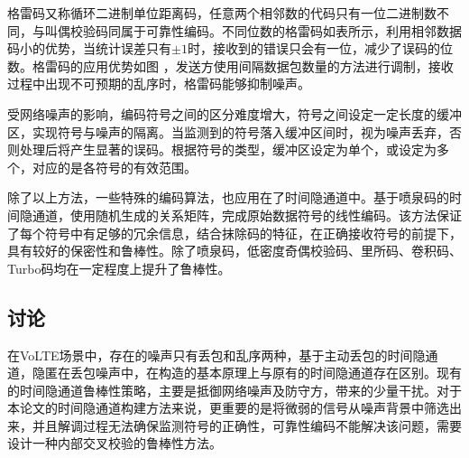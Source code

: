 格雷码又称循环二进制单位距离码，任意两个相邻数的代码只有一位二进制数不同，与叫偶校验码同属于可靠性编码。不同位数的格雷码如表所示，利用相邻数据码小的优势，当统计误差只有$\pm1$时，接收到的错误只会有一位，减少了误码的位数。格雷码的应用优势如图
，发送方使用间隔数据包数量的方法进行调制，接收过程中出现不可预期的乱序时，格雷码能够抑制噪声。

受网络噪声的影响，编码符号之间的区分难度增大，符号之间设定一定长度的缓冲区，实现符号与噪声的隔离。当监测到的符号落入缓冲区间时，视为噪声丢弃，否则处理后将产生显著的误码。根据符号的类型，缓冲区设定为单个，或设定为多个，对应的是各符号的有效范围。

除了以上方法，一些特殊的编码算法，也应用在了时间隐通道中。基于喷泉码的时间隐通道，使用随机生成的关系矩阵，完成原始数据符号的线性编码。该方法保证了每个符号中有足够的冗余信息，结合抹除码的特征，在正确接收符号的前提下，具有较好的保密性和鲁棒性。除了喷泉码，低密度奇偶校验码、里所码、卷积码、Turbo码均在一定程度上提升了鲁棒性。

\subsection{讨论}
在VoLTE场景中，存在的噪声只有丢包和乱序两种，基于主动丢包的时间隐通道，隐匿在丢包噪声中，在构造的基本原理上与原有的时间隐通道存在区别。现有的时间隐通道鲁棒性策略，主要是抵御网络噪声及防守方，带来的少量干扰。对于本论文的时间隐通道构建方法来说，更重要的是将微弱的信号从噪声背景中筛选出来，并且解调过程无法确保监测符号的正确性，可靠性编码不能解决该问题，需要设计一种内部交叉校验的鲁棒性方法。